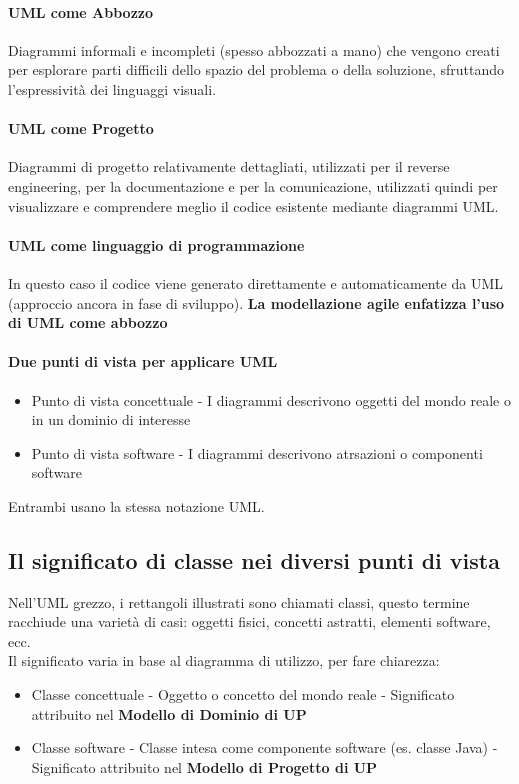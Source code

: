 \paragraph*{UML come Abbozzo} Diagrammi informali e incompleti (spesso abbozzati a mano)
che vengono creati per esplorare parti difficili dello spazio del problema o 
della soluzione, sfruttando l'espressività dei linguaggi visuali.
\paragraph*{UML come Progetto} Diagrammi di progetto relativamente dettagliati,
utilizzati per il reverse engineering, per la documentazione e per la comunicazione,
utilizzati quindi per visualizzare e comprendere meglio il codice esistente mediante
diagrammi UML.
\paragraph*{UML come linguaggio di programmazione} In questo caso il codice
viene generato direttamente e automaticamente da UML (approccio ancora in fase
di sviluppo).
\textbf{La modellazione agile enfatizza l'uso di UML come abbozzo}
\paragraph*{Due punti di vista per applicare UML}
\begin{itemize}
    \item Punto di vista concettuale - I diagrammi descrivono oggetti del mondo reale
    o in un dominio di interesse
    \item Punto di vista software - I diagrammi descrivono atrsazioni o componenti
    software
\end{itemize}
Entrambi usano la stessa notazione UML.
\subsection*{Il significato di classe nei diversi punti di vista}
Nell'UML grezzo, i rettangoli illustrati sono chiamati classi, questo termine
racchiude una varietà di casi: oggetti fisici, concetti astratti, elementi software, ecc.
\\ Il significato varia in base al diagramma di utilizzo, per fare chiarezza:
\begin{itemize}
    \item Classe concettuale - Oggetto o concetto del mondo reale - Significato
    attribuito nel \textbf{Modello di Dominio di UP}
    \item Classe software - Classe intesa come componente software (es. classe Java)
    - Significato attribuito nel \textbf{Modello di Progetto di UP}
\end{itemize}



